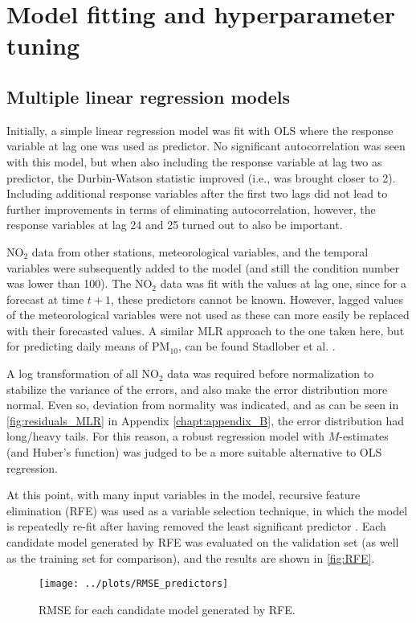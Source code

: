 \section{Model fitting and hyperparameter tuning}

\subsection{Multiple linear regression models}
Initially, a simple linear regression model was fit with OLS where the response variable at lag one was used as predictor. No significant autocorrelation was seen with this model, but when also including the response variable at lag two as predictor, the Durbin-Watson statistic improved (i.e., was brought closer to 2). Including additional response variables after the first two lags did not lead to further improvements in terms of eliminating autocorrelation, however, the response variables at lag 24 and 25 turned out to also be important. 

NO$_2$ data from other stations, meteorological variables, and the temporal variables were subsequently added to the model (and still the condition number was lower than 100). The NO$_2$ data was fit with the values at lag one, since for a forecast at time $t+1$, these predictors cannot be known. However, lagged values of the meteorological variables were not used as these can more easily be replaced with their forecasted values. A similar MLR approach to the one taken here, but for predicting daily means of PM$_{10}$, can be found Stadlober et al. \cite{Stadlober2008}. 

A log transformation of all NO$_2$ data was required before normalization to stabilize the variance of the errors, and also make the error distribution more normal. Even so, deviation from normality was indicated, and as can be seen in \cref{fig:residuals_MLR} in Appendix \ref{chapt:appendix_B}, the error distribution had long/heavy tails. For this reason, a robust regression model with $M$-estimates (and Huber's function) was judged to be a more suitable alternative to OLS regression.

At this point, with many input variables in the model, recursive feature elimination (RFE) was used as a variable selection technique, in which the model is repeatedly re-fit after having removed the least significant predictor \cite{Faraway2020}. Each candidate model generated by RFE was evaluated on the validation set (as well as the training set for comparison), and the results are shown in \vref{fig:RFE}. 
\begin{figure}[h] 
\begin{center}
\texttt{[image: ../plots/RMSE\_predictors]}
\caption{RMSE for each candidate model generated by RFE.}
\label{fig:RFE}
\end{center}
\end{figure}

